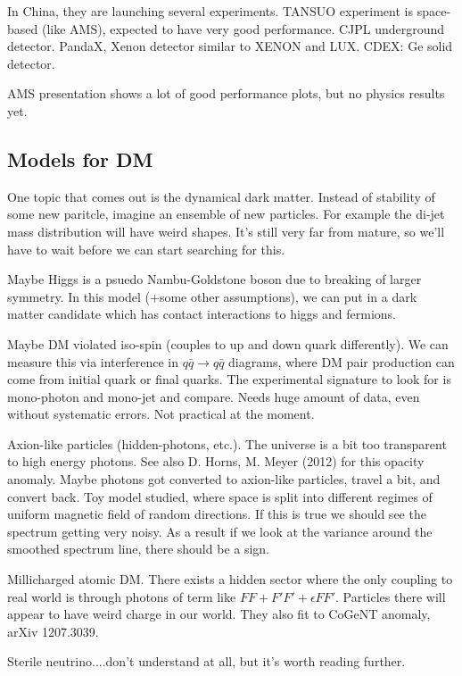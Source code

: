 \documentclass{fheadnote}
\begin{document}
In China, they are launching several experiments.
TANSUO experiment is space-based (like AMS), expected to have very good performance.
CJPL underground detector.  PandaX, Xenon detector similar to XENON and LUX.
CDEX: Ge solid detector.

AMS presentation shows a lot of good performance plots, but no physics results yet.

\subsection{Models for DM}

One topic that comes out is the dynamical dark matter.
Instead of stability of some new paritcle, imagine an ensemble of new particles.
For example the di-jet mass distribution will have weird shapes.
It's still very far from mature, so we'll have to wait before we can start searching for this.

Maybe Higgs is a psuedo Nambu-Goldstone boson due to breaking of larger symmetry.
In this model (+some other assumptions), we can put in a dark matter candidate
which has contact interactions to higgs and fermions.

Maybe DM violated iso-spin (couples to up and down quark differently).
We can measure this via interference in $q\bar{q} \rightarrow q\bar{q}$ diagrams,
where DM pair production can come from initial quark or final quarks.
The experimental signature to look for is mono-photon and mono-jet and compare.
Needs huge amount of data, even without systematic errors.
Not practical at the moment.

Axion-like particles (hidden-photons, etc.).
The universe is a bit too transparent to high energy photons.
See also D. Horns, M. Meyer (2012) for this opacity anomaly.
Maybe photons got converted to axion-like particles, travel a bit, and convert back.
Toy model studied, where space is split into different regimes of uniform magnetic field
of random directions.  If this is true we should see the spectrum getting very noisy.
As a result if we look at the variance around the smoothed spectrum line,
there should be a sign.

Millicharged atomic DM.  There exists a hidden sector where the only coupling to real world
is through photons of term like $FF + F'F' + \epsilon FF'$.
Particles there will appear to have weird charge in our world.
They also fit to CoGeNT anomaly, arXiv 1207.3039.

Sterile neutrino....don't understand at all, but it's worth reading further.
\end{document}
